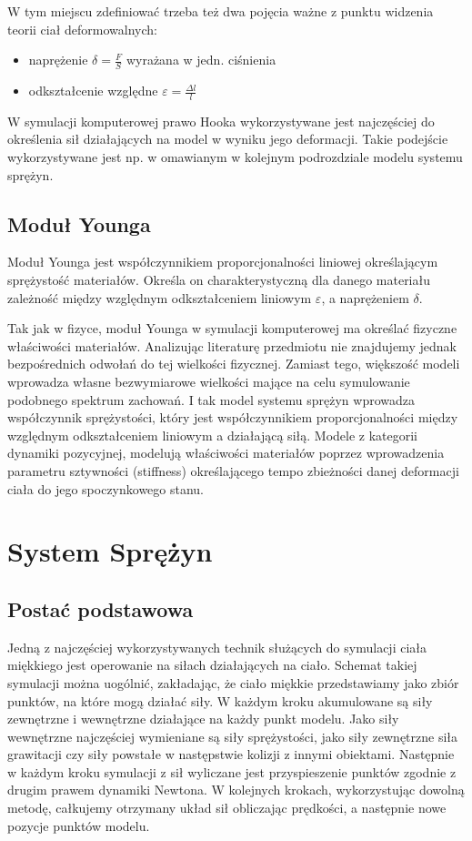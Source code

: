 W tym miejscu zdefiniować trzeba też dwa pojęcia ważne z punktu widzenia teorii
ciał deformowalnych:
\begin{itemize}
\item naprężenie $\delta = \frac{F}{S}$ wyrażana w jedn. ciśnienia
\item odkształcenie względne $\varepsilon = \frac{\Delta l}{l}$
\end{itemize}
 
W symulacji komputerowej prawo Hooka wykorzystywane jest najczęściej do określenia sił
działających na model w wyniku jego deformacji. Takie podejście wykorzystywane
jest np. w omawianym w kolejnym podrozdziale modelu systemu
sprężyn.

\subsection{Moduł Younga}
Moduł Younga jest współczynnikiem proporcjonalności liniowej określającym
sprężystość materiałów. Określa on charakterystyczną dla danego materiału
zależność między względnym odkształceniem liniowym $\varepsilon$, a
naprężeniem $\delta$.

Tak jak w fizyce, moduł Younga w symulacji komputerowej ma określać fizyczne
właściwości materiałów. Analizując literaturę przedmiotu nie znajdujemy jednak 
bezpośrednich odwołań do tej wielkości fizycznej. Zamiast tego, większość modeli wprowadza
własne bezwymiarowe wielkości mające na celu symulowanie podobnego spektrum
zachowań. I tak model systemu sprężyn wprowadza współczynnik
sprężystości, który jest współczynnikiem proporcjonalności między względnym
odkształceniem liniowym a działającą siłą. Modele z kategorii dynamiki
pozycyjnej, modelują właściwości materiałów poprzez wprowadzenia parametru
sztywności (stiffness) określającego tempo zbieżności danej deformacji ciała do jego
spoczynkowego stanu.

\section{System Sprężyn}

\subsection{Postać podstawowa}

Jedną z najczęściej wykorzystywanych technik służących do symulacji ciała
miękkiego jest operowanie na siłach działających na ciało. Schemat takiej
symulacji można uogólnić, zakładając, że ciało miękkie przedstawiamy jako zbiór
punktów, na które mogą działać siły. W każdym kroku akumulowane są siły
zewnętrzne i wewnętrzne działające na każdy punkt modelu. Jako siły wewnętrzne
najczęściej wymieniane są siły sprężystości, jako siły zewnętrzne
siła grawitacji czy siły powstałe w następstwie kolizji z innymi obiektami.
Następnie w każdym kroku symulacji z sił wyliczane jest przyspieszenie punktów
zgodnie z drugim prawem dynamiki Newtona. W kolejnych krokach, wykorzystując
dowolną metodę, całkujemy otrzymany układ sił obliczając prędkości, a następnie
nowe pozycje punktów modelu.\cite{pbdyn}

